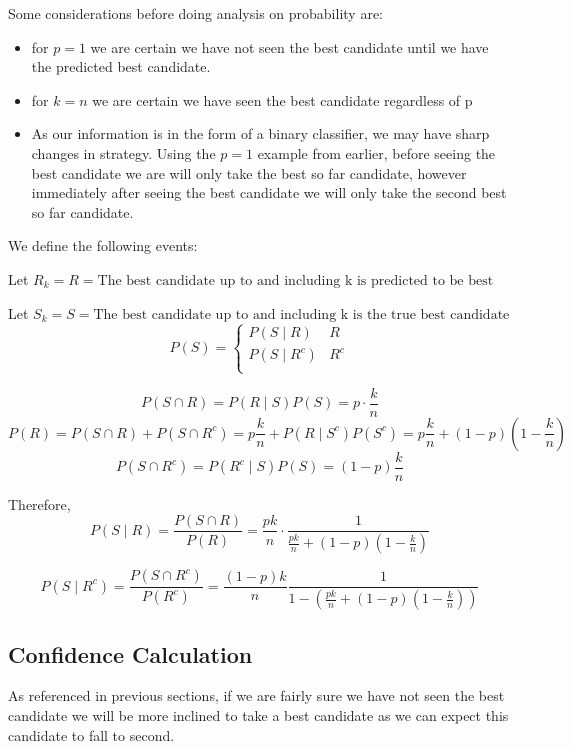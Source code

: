 \documentclass[a4paper,11pt]{article}
\begin{document}
Some considerations before doing analysis on probability are: 

\begin{itemize}
\item for $p = 1$ we are certain we have not seen the best candidate until we have the predicted best candidate. 
\item for $k = n$ we are certain we have seen the best candidate regardless of p
\item As our information is in the form of a binary classifier, we may have sharp changes in strategy. Using the $p =1$ example from earlier, before seeing the best candidate we are will only take the best so far candidate, however immediately after seeing the best candidate we will only take the second best so far candidate.
\end{itemize}

We define the following events:

Let $R_k = R = \text{The best candidate up to and including k is predicted to be best}$ 

Let $S_k = S= \text{The best candidate up to and including k is the true best candidate}$ \\
$$
P(S) = \begin{cases}
   P(S \mid R) & R\\
  P(S \mid R^c) & R^c\\
\end{cases}
$$


$$
P(S\cap R) = P(R \mid S)P(S) = p \cdot \frac{k}{n} 
$$
$$
P(R) = P(S\cap R) + P(S\cap R^c) = p\frac{k}{n} + P(R\mid S^c)P(S^c) = p\frac{k}{n} +\left(1-p\right)\left(1-\frac{k}{n}\right)
$$
$$
P(S\cap R^c) = P(R^c \mid S)P(S) = (1-p)\frac{k}{n} 
$$

Therefore,
$$
P(S \mid R) = \frac{P(S\cap R)}{P(R)} = \frac{pk}{n} \cdot \frac{1}{\frac{pk}{n}+(1-p)\left(1-\frac{k}{n}\right)}
$$

$$
P(S \mid R^c) = \frac{P(S\cap R^c)}{P(R^c)} = \frac{(1-p)k}{n}\frac{1}{1-(\frac{pk}{n}+(1-p)(1-\frac{k}{n}))}
$$

\subsection{Confidence Calculation}
\label{sec:novelAppraoch}

As referenced in previous sections, if we are fairly sure we have not seen the best candidate we will be more inclined to take a best candidate as we can expect this candidate to fall to second.
\end{document}

